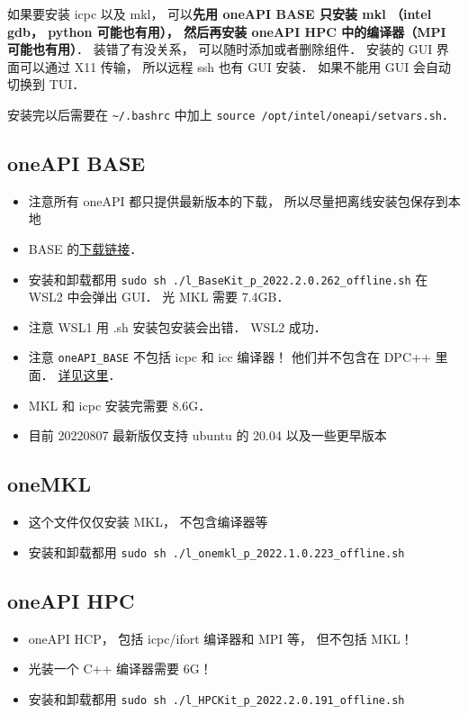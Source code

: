 

如果要安装 icpc 以及 mkl， 可以\textbf{先用 oneAPI BASE 只安装 mkl （intel gdb， python 可能也有用）， 然后再安装 oneAPI HPC 中的编译器（MPI 可能也有用）}．
装错了有没关系， 可以随时添加或者删除组件． 安装的 GUI 界面可以通过 X11 传输， 所以远程 ssh 也有 GUI 安装． 如果不能用 GUI 会自动切换到 TUI．

安装完以后需要在 \verb|~/.bashrc| 中加上 \verb|source /opt/intel/oneapi/setvars.sh|．

\subsection{oneAPI BASE}
\begin{itemize}
\item 注意所有 oneAPI 都只提供最新版本的下载， 所以尽量把离线安装包保存到本地
\item BASE 的\href{https://www.intel.com/content/www/us/en/developer/tools/oneapi/base-toolkit-download.html?operatingsystem=linux&distributions=webdownload&options=offline}{下载链接}．
\item 安装和卸载都用 \verb`sudo sh ./l_BaseKit_p_2022.2.0.262_offline.sh` 在 WSL2 中会弹出 GUI． 光 MKL 需要 7.4GB．
\item 注意 WSL1 用 .sh 安装包安装会出错． WSL2 成功．
\item 注意 \verb|oneAPI_BASE| 不包括 icpc 和 icc 编译器！ 他们并不包含在 DPC++ 里面． \href{https://stackoverflow.com/questions/66527842/can-not-find-the-icc-compiler-after-having-installed-intel-oneapi-invoking-from}{详见这里}．
\item MKL 和 icpc 安装完需要 8.6G．
\item 目前 20220807 最新版仅支持 ubuntu 的 20.04 以及一些更早版本
\end{itemize}

\subsection{oneMKL}
\begin{itemize}
\item 这个文件仅仅安装 MKL， 不包含编译器等
\item 安装和卸载都用 \verb`sudo sh ./l_onemkl_p_2022.1.0.223_offline.sh`
\end{itemize}

\subsection{oneAPI HPC}
\begin{itemize}
\item oneAPI HCP， 包括 icpc/ifort 编译器和 MPI 等， 但不包括 MKL！
\item 光装一个 C++ 编译器需要 6G！
\item 安装和卸载都用 \verb`sudo sh ./l_HPCKit_p_2022.2.0.191_offline.sh`
\end{itemize}
